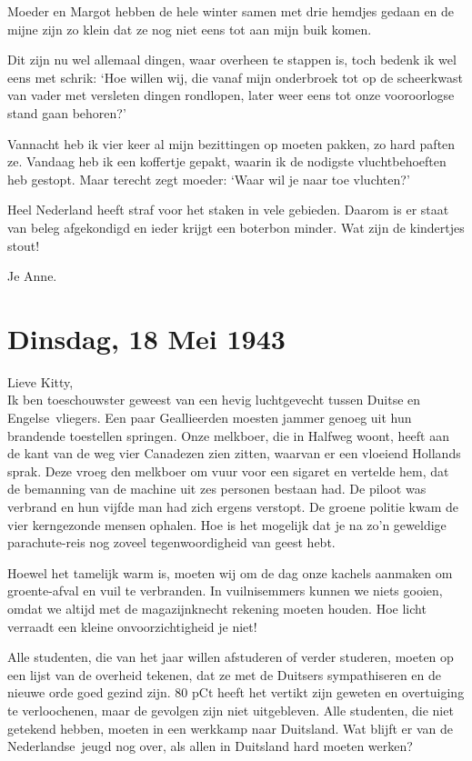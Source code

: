 \documentclass{book}
\begin{document}
Moeder en Margot hebben de hele winter samen met drie hemdjes gedaan en
de mijne zijn zo klein dat ze nog niet eens tot aan mijn buik komen.

Dit zijn nu wel allemaal dingen, waar overheen te stappen is, toch
bedenk ik wel eens met schrik: `Hoe willen wij, die vanaf mijn
onderbroek tot op de scheerkwast van vader met versleten dingen
rondlopen, later weer eens tot onze vooroorlogse stand gaan behoren?'

Vannacht heb ik vier keer al mijn bezittingen op moeten pakken, zo hard
paften ze. Vandaag heb ik een koffertje gepakt, waarin ik de nodigste
vluchtbehoeften heb gestopt. Maar terecht zegt moeder: `Waar wil je naar
toe vluchten?'

Heel Nederland heeft straf voor het staken in vele gebieden. Daarom is
er staat van beleg afgekondigd en ieder krijgt een boterbon minder. Wat
zijn de kindertjes stout!

Je Anne.

\chapter{Dinsdag, 18 Mei 1943}

Lieve Kitty,\\Ik ben toeschouwster geweest van een hevig luchtgevecht
tussen Duitse en Engelse~vliegers. Een paar Geallieerden moesten jammer
genoeg uit hun brandende toestellen springen. Onze melkboer, die in
Halfweg woont, heeft aan de kant van de weg vier Canadezen zien zitten,
waarvan er een vloeiend Hollands sprak. Deze vroeg den melkboer om vuur
voor een sigaret en vertelde hem, dat de bemanning van de machine uit
zes personen bestaan had. De piloot was verbrand en hun vijfde man had
zich ergens verstopt. De groene politie kwam de vier kerngezonde mensen
ophalen. Hoe is het mogelijk dat je na zo'n geweldige parachute-reis nog
zoveel tegenwoordigheid van geest hebt.

Hoewel het tamelijk warm is, moeten wij om de dag onze kachels aanmaken
om groente-afval en vuil te verbranden. In vuilnisemmers kunnen we niets
gooien, omdat we altijd met de magazijnknecht rekening moeten houden.
Hoe licht verraadt een kleine onvoorzichtigheid je niet!

Alle studenten, die van het jaar willen afstuderen of verder studeren,
moeten op een lijst van de overheid tekenen, dat ze met de Duitsers
sympathiseren en de nieuwe orde goed gezind zijn. 80 pCt heeft het
vertikt zijn geweten en overtuiging te verloochenen, maar de gevolgen
zijn niet uitgebleven. Alle studenten, die niet getekend hebben, moeten
in een werkkamp naar Duitsland. Wat blijft er van de Nederlandse~jeugd
nog over, als allen in Duitsland hard moeten werken?
\end{document}
